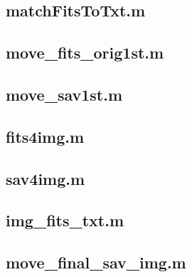 \documentclass[11pt]{article}
\begin{document}
	\subsection{matchFitsToTxt.m}
	\vspace{-0.25cm}
	 
	\vspace{0.25cm}
	
	\subsection{move\_fits\_orig1st.m}
	\vspace{-0.25cm}
	 
	\vspace{0.25cm}
	
	\subsection{move\_sav1st.m}
	\vspace{-0.25cm}
	 
	\vspace{0.25cm}
	
	\subsection{fits4img.m}
	\vspace{-0.25cm}
	 
	\vspace{0.25cm}
	
	\subsection{sav4img.m}
	\vspace{-0.25cm}
	 
	\vspace{0.25cm}
	
	\subsection{img\_fits\_txt.m}
	\vspace{-0.25cm}
	 
	\vspace{0.25cm}
	
	\subsection{move\_final\_sav\_img.m}
	\vspace{-0.25cm}
	 
	\vspace{0.25cm}
	
\end{document}
